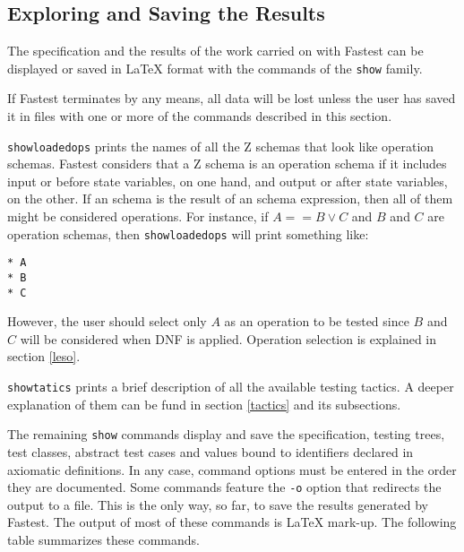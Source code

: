 

\subsection{\label{esr}Exploring and Saving the Results}

The specification and the results of the work carried on with Fastest can be displayed or saved in \LaTeX{} format with the commands of the \verb+show+ family. 

\vspace{5mm} If Fastest terminates by any means, all data will be lost unless the user has saved it in files with one or more of the commands described in this section.\vspace{5mm}

\verb+showloadedops+ prints the names of all the Z schemas that look like operation schemas. Fastest considers that a Z schema is an operation schema if it includes input or before state variables, on one hand, and output or after state variables, on the other. If an schema is the result of an schema expression, then all of them might be considered operations. For instance, if $A == B \lor C$ and $B$ and $C$ are operation schemas, then \verb+showloadedops+ will print something like:

\begin{verbatim}
* A
* B
* C
\end{verbatim}

However, the user should select only $A$ as an operation to be tested since $B$ and $C$ will be considered when DNF is applied. Operation selection is explained in section \ref{leso}.

\verb+showtatics+ prints a brief description of all the available testing tactics. A deeper explanation of them can be fund in section \ref{tactics} and its subsections.

The remaining \verb+show+ commands display and save the specification, testing trees, test classes, abstract test cases and values bound to identifiers declared in axiomatic definitions. In any case, command options must be entered in the order they are documented. Some commands feature the \verb+-o+ option that redirects the output to a file. This is the only way, so far, to save the results generated by Fastest. The output of most of these commands is \LaTeX{} mark-up. The following table summarizes these commands.

